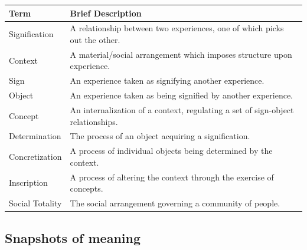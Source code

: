 \begin{table}[!ht]
\centering
\begin{tabular}{l|l}
\toprule
Term            & Brief Description \\
\midrule
Signification   & A relationship between two experiences, one of which picks out the other. \\
Context         & A material/social arrangement which imposes structure upon experience. \\
Sign            & An experience taken as signifying another experience. \\
Object          & An experience taken as being signified by another experience. \\
Concept         & An internalization of a context, regulating a set of sign-object relationships. \\
Determination   & The process of an object acquiring a signification. \\
Concretization  & A process of individual objects being determined by the context. \\
Inscription     & A process of altering the context through the exercise of concepts. \\
Social Totality  & The social arrangement governing a community of people. \\
\bottomrule
\end{tabular}
\end{table}

\subsection{Snapshots of meaning}

